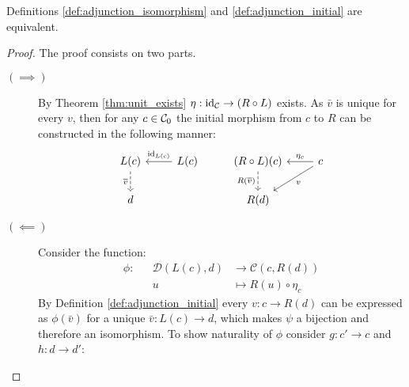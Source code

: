 \begin{theorem}
  Definitions \ref{def:adjunction_isomorphism} and \ref{def:adjunction_initial}
  are equivalent.

  \begin{proof}
    The proof consists on two parts.
    \begin{description}
      \item[$(\implies)$] By Theorem \ref{thm:unit_exists} $\eta:\mathrm{id}_{\mathcal{C}}\to
        (R\circ L)$ exists. As $\bar{v}$ is unique for every $v$, then for any
        $c\in \mathcal{C}_0$ the initial morphism from $c$ to $R$ can be constructed in
        the following manner:
        \[\begin{tikzcd}[ampersand replacement=\&]
          {L(c)} \& {L(c)} \& {(R\circ L)(c)} \& c \\
          d \&\& {R(d)}
          \arrow["{\id_{L(c)}}"', from=1-2, to=1-1]
          \arrow["{\eta_c}"', from=1-4, to=1-3]
          \arrow["v", from=1-4, to=2-3]
          \arrow["{\bar{v}}"', dashed, from=1-1, to=2-1]
          \arrow["{R(\bar{v})}"', dashed, from=1-3, to=2-3]
        \end{tikzcd}\]
      \item[$(\impliedby)$] Consider the function:
        \[
          \begin{aligned}
            \phi:&&\mathcal{D}(L(c), d) &\to \mathcal{C}(c, R(d))\\
            && u &\mapsto R(u) \circ \eta_c
          \end{aligned}
        \]
        By Definition \ref{def:adjunction_initial} every $v:c\to R(d)$ can be
        expressed as $\phi(\bar{v})$ for a unique $\bar{v}:L(c)\to d$, which
        makes $\psi$ a bijection and therefore an isomorphism. To show
        naturality of $\phi$ consider $g:c'\to c$ and $h:d\to d'$:

\end{description}
\end{proof}
\end{theorem}
